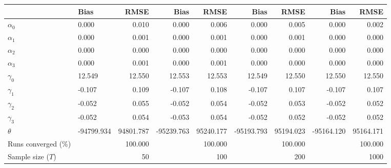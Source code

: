 
\begin{tabular}[t]{llrrrrrrr}
\toprule
  & Bias & RMSE & Bias & RMSE & Bias & RMSE & Bias & RMSE\\
\midrule
$\alpha_{0}$ & 0.000 & 0.010 & 0.000 & 0.006 & 0.000 & 0.005 & 0.000 & 0.002\\
$\alpha_{1}$ & 0.000 & 0.001 & 0.000 & 0.001 & 0.000 & 0.001 & 0.000 & 0.000\\
$\alpha_{2}$ & 0.000 & 0.000 & 0.000 & 0.000 & 0.000 & 0.000 & 0.000 & 0.000\\
$\alpha_{3}$ & 0.000 & 0.001 & 0.000 & 0.001 & 0.000 & 0.000 & 0.000 & 0.000\\
$\gamma_{0}$ & 12.549 & 12.550 & 12.553 & 12.553 & 12.549 & 12.550 & 12.550 & 12.550\\
$\gamma_{1}$ & -0.107 & 0.109 & -0.107 & 0.108 & -0.107 & 0.107 & -0.107 & 0.107\\
$\gamma_{2}$ & -0.052 & 0.055 & -0.052 & 0.054 & -0.052 & 0.053 & -0.052 & 0.052\\
$\gamma_{3}$ & -0.052 & 0.054 & -0.053 & 0.054 & -0.052 & 0.052 & -0.052 & 0.052\\
$\theta$ & -94799.934 & 94801.787 & -95239.763 & 95240.177 & -95193.793 & 95194.023 & -95164.120 & 95164.171\\
Runs converged (\%) &  & 100.000 &  & 100.000 &  & 100.000 &  & 100.000\\
Sample size ($T$) &  & 50 &  & 100 &  & 200 &  & 1000\\
\bottomrule
\end{tabular}
